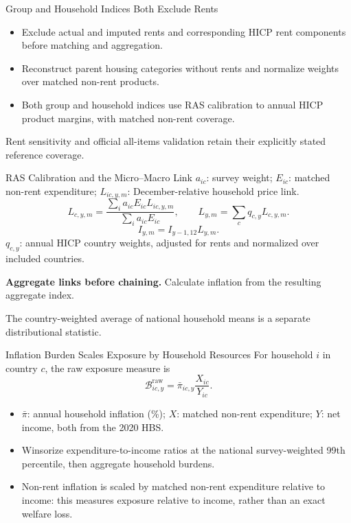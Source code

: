 \documentclass[11pt,aspectratio=169]{beamer}
\begin{document}
\begin{frame}{Group and Household Indices Both Exclude Rents}
\begin{itemize}
\item Exclude actual and imputed rents and corresponding HICP rent components before matching and aggregation.
\item Reconstruct parent housing categories without rents and normalize weights over matched non-rent products.
\item Both group and household indices use RAS calibration to annual HICP product margins, with matched non-rent coverage.
\end{itemize}
\par\vspace{.5em}
Rent sensitivity and official all-items validation retain their explicitly stated reference coverage.
\end{frame}

\begin{frame}{RAS Calibration and the Micro--Macro Link}
\small
$a_{ic}$: survey weight; $E_{ic}$: matched non-rent expenditure; $L_{ic,y,m}$: December-relative household price link.
\[
L_{c,y,m}=\frac{\sum_i a_{ic}E_{ic}L_{ic,y,m}}{\sum_i a_{ic}E_{ic}},
\qquad L_{y,m}=\sum_c q_{c,y}L_{c,y,m}.
\]
\[
I_{y,m}=I_{y-1,12}L_{y,m}.
\]
$q_{c,y}$: annual HICP country weights, adjusted for rents and normalized over included countries.
\par\medskip
\textbf{Aggregate links before chaining.} Calculate inflation from the resulting aggregate index.
\par\medskip
The country-weighted average of national household means is a separate distributional statistic.
\end{frame}

\begin{frame}{Inflation Burden Scales Exposure by Household Resources}
For household $i$ in country $c$, the raw exposure measure is
\[
\mathcal B^{\mathrm{raw}}_{ic,y}=\bar\pi_{ic,y}\frac{X_{ic}}{Y_{ic}}.
\]
\begin{itemize}
\item $\bar\pi$: annual household inflation (\%); $X$: matched non-rent expenditure; $Y$: net income, both from the 2020 HBS.
\item Winsorize expenditure-to-income ratios at the national survey-weighted 99th percentile, then aggregate household burdens.
\item Non-rent inflation is scaled by matched non-rent expenditure relative to income: this measures exposure relative to income, rather than an exact welfare loss.
\end{itemize}
\end{frame}
\end{document}
